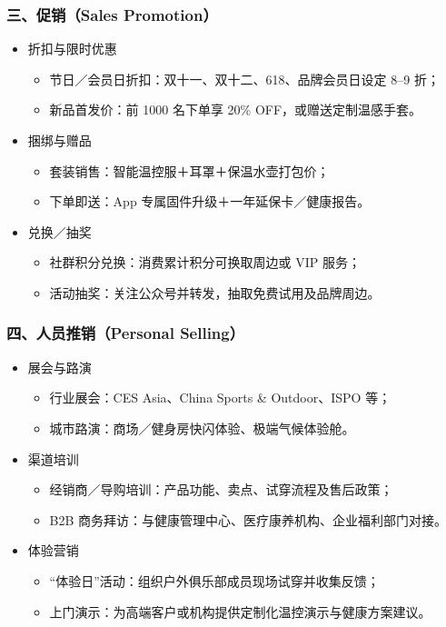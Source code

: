 \documentclass[UTF8]{report}
\theoremstyle{MyLineTheoremStyle} %
\theoremstyle{MyBlockTheoremStyle} %
\theoremstyle{MySubsubsectionStyle} %
\begin{document}
  \subsubsection{三、促销（Sales Promotion）}
    \begin{itemize}
      \item 折扣与限时优惠  
        \begin{itemize}
          \item 节日／会员日折扣：双十一、双十二、618、品牌会员日设定 8–9 折；  
          \item 新品首发价：前 1000 名下单享 20\% OFF，或赠送定制温感手套。  
        \end{itemize}
      \item 捆绑与赠品  
        \begin{itemize}
          \item 套装销售：智能温控服＋耳罩＋保温水壶打包价；  
          \item 下单即送：App 专属固件升级＋一年延保卡／健康报告。  
        \end{itemize}
      \item 兑换／抽奖  
        \begin{itemize}
          \item 社群积分兑换：消费累计积分可换取周边或 VIP 服务；  
          \item 活动抽奖：关注公众号并转发，抽取免费试用及品牌周边。  
        \end{itemize}
    \end{itemize}

  \subsubsection{四、人员推销（Personal Selling）}
    \begin{itemize}
      \item 展会与路演  
        \begin{itemize}
          \item 行业展会：CES Asia、China Sports \& Outdoor、ISPO 等；  
          \item 城市路演：商场／健身房快闪体验、极端气候体验舱。  
        \end{itemize}
      \item 渠道培训  
        \begin{itemize}
          \item 经销商／导购培训：产品功能、卖点、试穿流程及售后政策；  
          \item B2B 商务拜访：与健康管理中心、医疗康养机构、企业福利部门对接。  
        \end{itemize}
      \item 体验营销  
        \begin{itemize}
          \item “体验日”活动：组织户外俱乐部成员现场试穿并收集反馈；  
          \item 上门演示：为高端客户或机构提供定制化温控演示与健康方案建议。  
        \end{itemize}
    \end{itemize}
\end{document}
